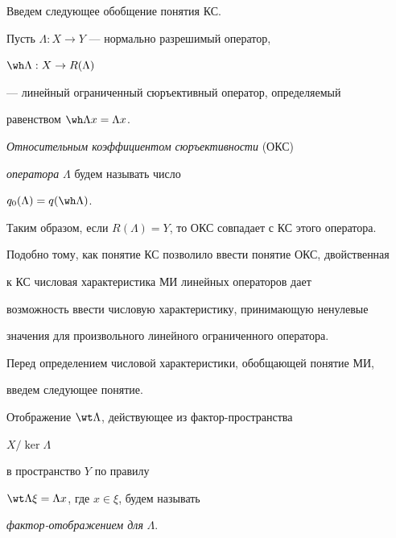 


Введем следующее обобщение понятия КС.  


 


\begin{defn} Пусть $\Lambda:X\to Y$ --- нормально разрешимый оператор, 


$\wh\Lambda:X\to R(\Lambda)$ 


--- линейный ограниченный сюръективный оператор, определяемый 


равенством $\wh\Lambda x=\Lambda x$. 


{\it Относительным коэффициентом сюръективности} (ОКС) 


{\it оператора} $\Lambda$ будем называть число 


$q_0(\Lambda)=q(\wh\Lambda)$. 


\end{defn} 


 


Таким образом, если $R(\Lambda)=Y$, то ОКС совпадает с КС этого оператора. 


 


Подобно тому, как понятие КС позволило ввести понятие ОКС, двойственная 


к КС числовая характеристика МИ линейных операторов дает 


возможность ввести числовую характеристику, принимающую ненулевые 


значения для произвольного линейного ограниченного оператора.  


Перед определением числовой характеристики, обобщающей понятие МИ,  


введем следующее понятие. 


 


\begin{defn} Отображение $\wt\Lambda$, действующее из фактор-пространства 


$X/\ker\Lambda$ 


в пространство $Y$ по правилу 


$\wt\Lambda\xi=\Lambda x$, где $x\in\xi$, будем называть 


{\it фактор-отображением для} $\Lambda$. 


\end{defn} 


 


